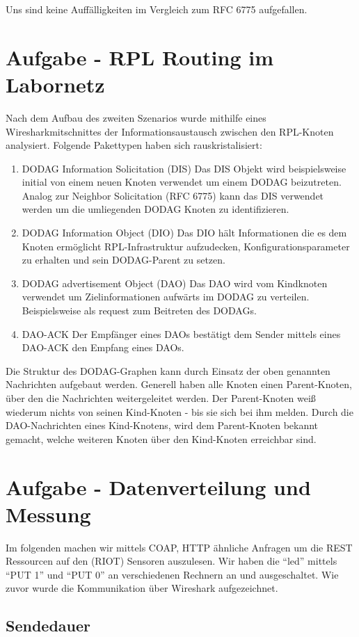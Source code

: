 \documentclass[paper=a4, fontsize=11pt]{scrartcl} %
\numberwithin{equation}{section} %
\numberwithin{figure}{section} %
\numberwithin{table}{section} %
\begin{document}
Uns sind keine Auffälligkeiten im Vergleich zum RFC 6775 aufgefallen.

\section{Aufgabe - RPL Routing im Labornetz}
Nach dem Aufbau des zweiten Szenarios wurde mithilfe eines Wiresharkmitschnittes der Informationsaustausch zwischen den RPL-Knoten analysiert. Folgende Pakettypen haben sich rauskristalisiert:
\begin{enumerate}
  \item DODAG Information Solicitation (DIS)
  Das DIS Objekt wird beispielsweise initial von einem neuen Knoten verwendet um einem DODAG beizutreten. Analog zur Neighbor Solicitation (RFC 6775) kann das DIS verwendet werden um die umliegenden DODAG Knoten zu identifizieren.
  \item DODAG Information Object (DIO)
  Das DIO hält Informationen die es dem Knoten ermöglicht RPL-Infrastruktur aufzudecken, Konfigurationsparameter zu erhalten und sein DODAG-Parent zu setzen.
  \item DODAG advertisement Object (DAO)
  Das DAO wird vom Kindknoten verwendet um Zielinformationen aufwärts im DODAG zu verteilen. Beispielsweise als request zum Beitreten des DODAGs.
  \item DAO-ACK
  Der Empfänger eines DAOs bestätigt dem Sender mittels eines DAO-ACK den Empfang eines DAOs.
\end{enumerate}
Die Struktur des DODAG-Graphen kann durch Einsatz der oben genannten Nachrichten aufgebaut werden. Generell haben alle Knoten einen Parent-Knoten, über den die Nachrichten weitergeleitet werden. Der Parent-Knoten weiß wiederum nichts von seinen Kind-Knoten - bis sie sich bei ihm melden. Durch die DAO-Nachrichten eines Kind-Knotens, wird dem Parent-Knoten bekannt gemacht, welche weiteren Knoten über den Kind-Knoten erreichbar sind.
\section{Aufgabe - Datenverteilung und Messung}

Im folgenden machen wir mittels COAP, HTTP ähnliche Anfragen um die REST Ressourcen auf den (RIOT) Sensoren auszulesen. Wir haben die ``led'' mittels ``PUT 1'' und ``PUT 0'' an verschiedenen Rechnern an und ausgeschaltet. Wie zuvor wurde die Kommunikation über Wireshark aufgezeichnet.

\subsection{Sendedauer}
\end{document}
